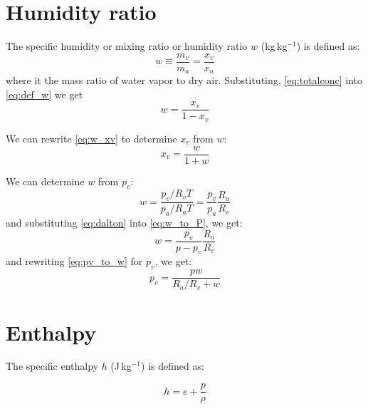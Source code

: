 \section*{Humidity ratio}


The specific humidity or mixing ratio or humidity ratio $w$ (kg\,kg$^{-1}$) is defined as:
\begin{equation}
w \equiv \frac{m_v}{m_a} = \frac{x_v}{x_a}
\label{eq:def_w}
\end{equation}
where it the mass ratio of water vapor to dry air. Substituting, \ref{eq:totalconc} into \ref{eq:def_w} we get
\begin{equation}
w = \frac{x_v}{1 - x_v}
\label{eq:w_xv}
\end{equation}

We can rewrite \ref{eq:w_xv} to determine $x_v$ from $w$:
\begin{equation}
x_v = \frac{w}{1 + w}
\label{eq:xv_w}
\end{equation}

We can determine $w$ from $p_v$:
\begin{equation}
w = \frac{p_v/R_v T}{p_a/ R_aT} = \frac{p_v}{p_a}\frac{R_a}{R_v}
\label{eq:w_to_P}
\end{equation}
and substituting \ref{eq:dalton} into \ref{eq:w_to_P}, we get:
\begin{equation}
w = \frac{p_v}{p-p_v}\frac{R_a}{R_v}
\label{eq:pv_to_w}
\end{equation}
and rewriting \ref{eq:pv_to_w} for $p_v$, we get:
\begin{equation}
p_v = \frac{p w}{R_a/R_v+w}
\label{eq:w_to_pv}
\end{equation}

\section*{Enthalpy}

The specific enthalpy $h$ (J\,kg$^{-1}$) is defined as:

\begin{equation}
h = e + \frac{p}{\rho}
\end{equation}


